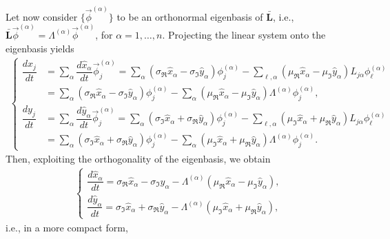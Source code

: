 \documentclass[aps,showpacs,preprintnumbers,amsmath,amssymb,twocolumn,superscriptaddress,floatfix,nofootinbib,10pt,pre]{revtex4-1}
\begin{document}
Let now consider $\{\vec{\phi}^{(\alpha)}\}$ to be an orthonormal eigenbasis of $\bar{\mathbf{L}}$, i.e., $\bar{\mathbf{L}}\vec{\phi}^{(\alpha)} = \Lambda^{(\alpha)} \vec{\phi}^{(\alpha)}$, for $\alpha=1,\dots,n$.
Projecting the linear system onto the eigenbasis yields
\begin{align}
    \begin{cases}
        \dfrac{d{x}_j}{dt} &= \sum_\alpha\dfrac{d{\hat{x}}_\alpha}{dt}\vec{\phi}^{(\alpha)}_j = \sum_\alpha(\sigma_{\Re}\hat{x}_\alpha-\sigma_{\Im}\hat{y}_\alpha)\phi^{(\alpha)}_j-\sum_{\ell,\alpha}(\mu_{\Re}\hat{x}_\alpha-\mu_{\Im}\hat{y}_\alpha)L_{j\alpha}\phi^{(\alpha)}_\ell\\
        &= \sum_\alpha(\sigma_{\Re}\hat{x}_\alpha-\sigma_{\Im}\hat{y}_\alpha)\phi^{(\alpha)}_j-\sum_{\alpha}(\mu_{\Re}\hat{x}_\alpha-\mu_{\Im}\hat{y}_\alpha)\Lambda^{(\alpha)}\phi^{(\alpha)}_j, \\
        \dfrac{d{y}_j}{dt} &= \sum_\alpha\dfrac{d{\hat{y}}_\alpha}{dt}\vec{\phi}^{(\alpha)}_j = \sum_\alpha(\sigma_{\Im}\hat{x}_\alpha+\sigma_{\Re}\hat{y}_\alpha)\phi^{(\alpha)}_j-\sum_{\ell,\alpha}(\mu_{\Im}\hat{x}_\alpha+\mu_{\Re}\hat{y}_\alpha)L_{j\alpha}\phi^{(\alpha)}_\ell\\
        &= \sum_\alpha(\sigma_{\Im}\hat{x}_\alpha+\sigma_{\Re}\hat{y}_\alpha)\phi^{(\alpha)}_j-\sum_{\alpha}(\mu_{\Im}\hat{x}_\alpha+\mu_{\Re}\hat{y}_\alpha)\Lambda^{(\alpha)}\phi^{(\alpha)}_j.
    \end{cases}
\end{align}
Then, exploiting the orthogonality of the eigenbasis, we obtain
\begin{align}
    \begin{cases}
        \dfrac{d{\hat{x}}_\alpha}{dt} = \sigma_{\Re}\hat{x}_\alpha-\sigma_{\Im}\hat{y}_\alpha-\Lambda^{(\alpha)}(\mu_{\Re}\hat{x}_\alpha-\mu_{\Im}\hat{y}_\alpha),\\
        \dfrac{d{\hat
        y}_\alpha}{dt} = \sigma_{\Im}\hat{x}_\alpha+\sigma_{\Re}\hat{y}_\alpha - \Lambda^{(\alpha)}(\mu_{\Im}\hat{x}_\alpha+\mu_{\Re}\hat{y}_\alpha),
    \end{cases}
\end{align}
i.e., in a more compact form,
\end{document}
